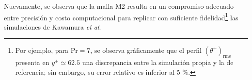 Nuevamente, se observa que la malla M2 resulta en un compromiso adecuado entre precisión y costo computacional para replicar con suficiente fidelidad\footnote{Por ejemplo, para $\text{Pr}=7$, se observa gráficamente que el perfil $(\theta^+)_{\text{rms}}$ presenta en $y^+ \simeq 62\text{.}5$ una discrepancia entre la simulación propia y la de referencia; sin embargo, su error relativo es inferior al 5 \%.} las simulaciones de \linebreak Kawamura \textit{et al}. 

\begin{figure}[H]
 \centering
 

\end{figure}
